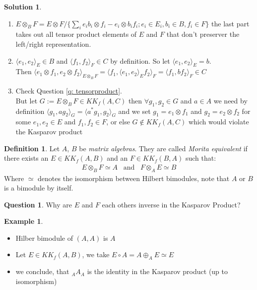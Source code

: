\documentclass[a4paper]{article}
\theoremstyle{definition}
\newtheorem{definition}{Definition}
\theoremstyle{definition}
\newtheorem{question}{Question}
\theoremstyle{definition}
\newtheorem{example}{Example}
\theoremstyle{theorem}
\theoremstyle{theorem}
\theoremstyle{theorem}
\theoremstyle{definition}
\newtheorem{solution}{Solution}
\begin{document}
\begin{solution}
    \
    \begin{enumerate}
        \item $E \otimes _B F = E \otimes F / \{\sum_i e_i b_i \otimes f_i - e_i \otimes b_i f_i;
            e_i \in E_i, b_i \in B, f_i \in F\}$ the last part takes out all tensor product elements of
            $E$ and $F$ that don't preserver the left/right representation.
        \item $\langle e_1, e_2\rangle _E \in B$ and $\langle f_1, f_2\rangle _F \in C$ by definition. So let $\langle e_1, e_2\rangle _E =b$. \\
            Then $\langle e_1 \otimes f_1, e_2 \otimes f_2\rangle _{E\otimes _B F} = \langle f_1, \langle e_1, e_2\rangle _E f_2\rangle _F =
            \langle f_1, b f_2\rangle _F \in C$
        \item Check Question \ref{q: tensorproduct}.\\
            But let $G := E\otimes _B F \in KK_f(A,C)$ then $\forall g_1, g_2 \in G$ and $a \in A$ we need
            by definition $\langle g_1, ag_2\rangle _G = \langle a^*g_1, g_2\rangle _G$ and we set $g_1 = e_1 \otimes f_1$ and
            $g_2 = e_2 \otimes f_2$ for some $e_1, e_2 \in E$ and $f_1, f_2 \in F$, or else
            $G \notin KK_f(A,C)$ which would violate the Kasparov product
    \end{enumerate}
\end{solution}

\begin{definition}
    Let $A$, $B$ be \textit{matrix algebras}. They are called \textit{Morita equivalent} if there
    exists an $E \in KK_f(A, B)$ and an $F \in KK_f(B, A)$ such that:
    \begin{align*}
        E \otimes _B F \simeq A \;\;\; \text{and} \;\;\; F \otimes _A E \simeq B
    \end{align*}
    Where $\simeq$ denotes the isomorphism between Hilbert bimodules, note that $A$ or $B$ is a bimodule by
    itself.
\end{definition}

\begin{question}
    Why are $E$ and $F$ each others inverse in the Kasparov Product?
\end{question}

\begin{example}
    \
    \begin{itemize}
        \item Hilber bimodule of $(A,A)$ is $A$
        \item Let $E \in KK_f(A,B)$, we take $E \circ A = A\oplus _A E \simeq E$
        \item we conclude, that $_A A_A$ is the identity in the Kasparov product (up to isomorphism)
    \end{itemize}
\end{example}
\end{document}
